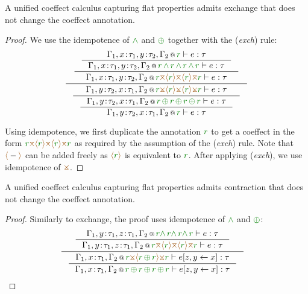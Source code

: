 \begin{lemma}
A unified coeffect calculus capturing flat properties admits exchange that does not change the
coeffect annotation.
\end{lemma}
\begin{proof}
We use the idempotence of $\czip$ and $\cpar$ together with the (\emph{exch}) rule:
\begin{equation*}
\inference
  { \inference
      { \inference
          {\coctx{\Gamma_1,x\!:\!\tau_1,y\!:\!\tau_2,\Gamma_2}{\cclrd{r}} \vdash e : \tau}
          {\coctx{\Gamma_1,x\!:\!\tau_1,y\!:\!\tau_2,\Gamma_2}{\cclrd{r} \,\czip\, \cclrd{r} \,\czip\, \cclrd{r} \,\czip\, \cclrd{r}} \vdash e : \tau} }
      { \coctx{\Gamma_1,x\!:\!\tau_1,y\!:\!\tau_2,\Gamma_2}{\cclrd{r} \azip \alift{\cclrd{r}} \azip \alift{\cclrd{r}} \azip \cclrd{r}} \vdash e : \tau } }
  { \inference
      {\coctx{\Gamma_1,y\!:\!\tau_2,x\!:\!\tau_1,\Gamma_2}{\cclrd{r} \apar \alift{\cclrd{r}} \apar \alift{\cclrd{r}} \apar \cclrd{r}} \vdash e : \tau}
      {\inference
         {\coctx{\Gamma_1,y\!:\!\tau_2,x\!:\!\tau_1,\Gamma_2}{\cclrd{r}\,\cpar\,\cclrd{r}\,\cpar\,\cclrd{r}\,\cpar\,\cclrd{r}} \vdash e : \tau}
         {\coctx{\Gamma_1,y\!:\!\tau_2,x\!:\!\tau_1,\Gamma_2}{\cclrd{r}} \vdash e : \tau} } }
\end{equation*}

\noindent
Using idempotence, we first duplicate the annotation $\cclrd{r}$ to get a coeffect in the form
$\cclrd{r} \azip \alift{\cclrd{r}} \azip \alift{\cclrd{r}} \azip \cclrd{r}$ as required by the
assumption of the (\emph{exch}) rule. Note that $\alift{-}$ can be added freely as
$\alift{\cclrd{r}}$ is equivalent to $\cclrd{r}$. After applying (\emph{exch}), we use
idempotence of $\apar$.
\end{proof}

\begin{lemma}
A unified coeffect calculus capturing flat properties admits contraction that does not change the
coeffect annotation.
\end{lemma}
\begin{proof}
Similarly to exchange, the proof uses idempotence of $\czip$ and $\cpar$:
\begin{equation*}
\inference
  { \inference
      {\coctx{\Gamma_1,y\!:\!\tau_1,z\!:\!\tau_1,\Gamma_2}{\cclrd{r} \czip\, \cclrd{r} \czip\, \cclrd{r} \czip\, \cclrd{r}} \vdash e : \tau}
      {\coctx{\Gamma_1,y\!:\!\tau_1,z\!:\!\tau_1,\Gamma_2}{\cclrd{r} \azip \alift{\cclrd{r}} \azip \alift{\cclrd{r}} \azip \cclrd{r}} \vdash e : \tau} }
  { \inference
      {\coctx{\Gamma_1,x\!:\!\tau_1,\Gamma_2}{\cclrd{r} \apar \alift{\cclrd{r} \,\cpar\, \cclrd{r}} \apar \cclrd{r}} \vdash \subst{e}{z,y}{x} : \tau}
      {\coctx{\Gamma_1,x\!:\!\tau_1,\Gamma_2}{\cclrd{r} \,\cpar\, \cclrd{r} \,\cpar\, \cclrd{r} \,\cpar\, \cclrd{r}} \vdash \subst{e}{z,y}{x} : \tau} }
\begin{array}{r} \\[2.5em] \qedhere \end{array}
\end{equation*}
\end{proof}


